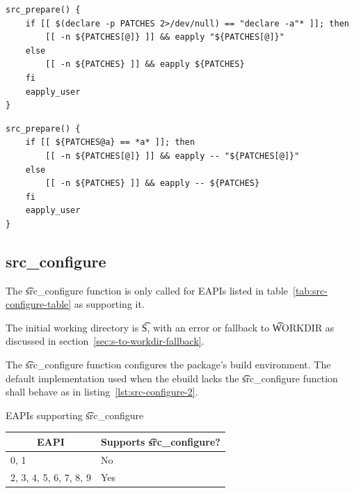 \begin{listing}[H]
\caption{\t{src_prepare}, format~6} \label{lst:src-prepare-6}
\begin{verbatim}
src_prepare() {
    if [[ $(declare -p PATCHES 2>/dev/null) == "declare -a"* ]]; then
        [[ -n ${PATCHES[@]} ]] && eapply "${PATCHES[@]}"
    else
        [[ -n ${PATCHES} ]] && eapply ${PATCHES}
    fi
    eapply_user
}
\end{verbatim}
\end{listing}

\begin{listing}[H]
\caption{\t{src_prepare}, format~8} \label{lst:src-prepare-8}
\begin{verbatim}
src_prepare() {
    if [[ ${PATCHES@a} == *a* ]]; then
        [[ -n ${PATCHES[@]} ]] && eapply -- "${PATCHES[@]}"
    else
        [[ -n ${PATCHES} ]] && eapply -- ${PATCHES}
    fi
    eapply_user
}
\end{verbatim}
\end{listing}

\subsection{src_configure}

 The \t{src_configure} function is only called for EAPIs listed in
table~\ref{tab:src-configure-table} as supporting it.

The initial working directory is \t{S}, with an error or fallback to \t{WORKDIR} as discussed in
section~\ref{sec:s-to-workdir-fallback}.

The \t{src_configure} function configures the package's build environment. The default
implementation used when the ebuild lacks the \t{src_configure} function shall behave as in
listing~\ref{lst:src-configure-2}.

\begin{centertable}{EAPIs supporting \t{src_configure}}
    \label{tab:src-configure-table}
    \begin{tabular}{ll}
      \toprule
      \multicolumn{1}{c}{\textbf{EAPI}} &
      \multicolumn{1}{c}{\textbf{Supports \t{src_configure}?}} \\
      \midrule
      0, 1                    & No  \\
      2, 3, 4, 5, 6, 7, 8, 9  & Yes \\
      \bottomrule
    \end{tabular}
\end{centertable}

